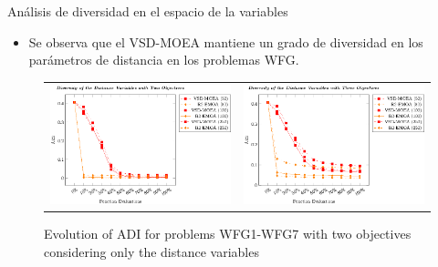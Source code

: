 \documentclass{beamer}
\begin{document}
\begin{frame}{Análisis de diversidad en el espacio de la variables}
\begin{itemize}
\item Se observa que el VSD-MOEA mantiene un grado de diversidad en los parámetros de distancia en los problemas WFG.
\end{itemize}
\begin{figure}
\centering
\begin{tabular}{cc}
\includegraphics[scale=0.6]{Images/Graphic-Diversity_2obj_tikz-figure1.eps} & \includegraphics[scale=0.6]{Images/Graphic-Diversity_3obj_tikz-figure1.eps} 
\end{tabular}
\caption{Evolution of ADI for problems WFG1-WFG7 with two objectives considering only the distance variables}
\end{figure}
\end{frame}
\end{document}
